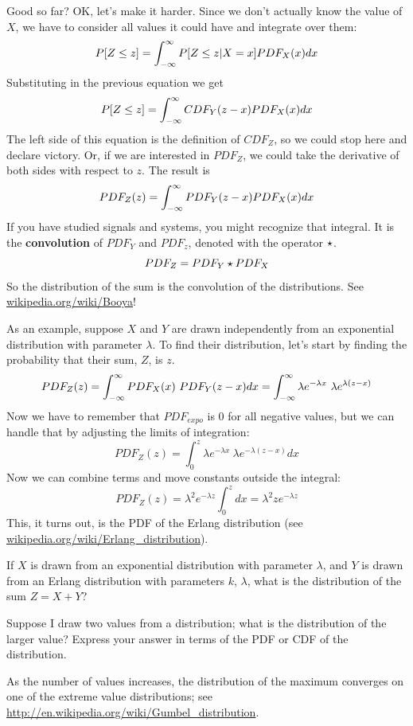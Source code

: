\documentclass[12pt]{book}
\begin{document}
Good so far?  OK, let's make it harder.  Since we don't actually know
the value of $X$, we have to consider all values it could have and
integrate over them:
%
\[ P[Z \le z] = \int_{-\infty}^{\infty} P[Z \le z | X = x] PDF_X(x) dx \]
%
Substituting in the previous equation we get
%
\[ P[Z \le z] = \int_{-\infty}^{\infty} CDF_Y(z-x) PDF_X(x) dx \]
%
The left side of this equation is the definition of
$CDF_Z$, so we could stop here and declare victory.  Or, if
we are interested in $PDF_Z$, we could take the derivative of
both sides with respect to $z$.  The result is
%
\[ PDF_Z(z) = \int_{-\infty}^{\infty} PDF_Y(z-x) PDF_X(x) dx  \]
%
If you have studied signals and systems, you might recognize that
integral.  It is the {\bf convolution} of $PDF_Y$ and $PDF_z$, denoted
with the operator $\star$.
%
\[ PDF_Z = PDF_Y \star PDF_X \]
%
So the distribution of the sum is the convolution of the distributions.
See \url{wikipedia.org/wiki/Booya}!

As an example, suppose $X$ and $Y$ are drawn independently from an
exponential distribution with parameter $\lambda$.  To find their
distribution, let's start by finding the probability that their
sum, $Z$, is $z$.
%
\[ PDF_Z(z) = \int_{-\infty}^{\infty} PDF_X(x)~PDF_Y(z-x) dx = 
\int_{-\infty}^{\infty} \lambda e^{-\lambda x}~\lambda e^{\lambda (z-x)} \]
%
Now we have to remember that $PDF_{expo}$ is 0 for all negative
values, but we can handle that by adjusting the limits of integration:
%
\[ PDF_Z(z) = \int_{0}^{z} \lambda e^{-\lambda x}~\lambda e^{-\lambda (z-x)} dx \]
%
Now we can combine terms and move constants outside the integral:
%
\[ PDF_Z(z) = \lambda^2 e^{-\lambda z} \int_{0}^{z} dx = 
\lambda^2 z e^{-\lambda z} \]
%
This, it turns out, is the PDF of the Erlang distribution (see
\url{wikipedia.org/wiki/Erlang_distribution}).


\begin{ex}

If $X$ is drawn from an exponential distribution with parameter
$\lambda$, and $Y$ is drawn from an Erlang distribution with parameters
$k$, $\lambda$, what is the distribution of the sum $Z = X+Y$?

\end{ex}

\begin{ex}

Suppose I draw two values from a distribution; what is the distribution
of the larger value?  Express your answer in terms of the PDF or CDF of
the distribution.

As the number of values increases, the distribution of the maximum
converges on one of the extreme value distributions; see
\url{http://en.wikipedia.org/wiki/Gumbel_distribution}.

\end{ex}
\end{document}
